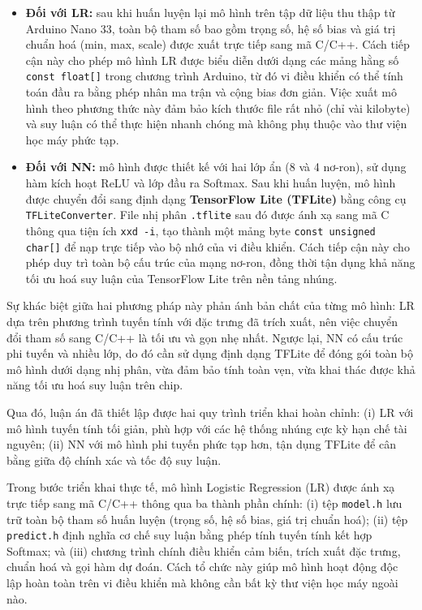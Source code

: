 \begin{itemize}
    \item \textbf{Đối với LR:} sau khi huấn luyện lại mô hình trên tập dữ liệu thu thập từ Arduino Nano 33, 
    toàn bộ tham số bao gồm trọng số, hệ số bias và giá trị chuẩn hoá (min, max, scale) 
    được xuất trực tiếp sang mã C/C++. Cách tiếp cận này cho phép mô hình LR 
    được biểu diễn dưới dạng các mảng hằng số \texttt{const float[]} trong chương trình Arduino, 
    từ đó vi điều khiển có thể tính toán đầu ra bằng phép nhân ma trận và cộng bias đơn giản. 
    Việc xuất mô hình theo phương thức này đảm bảo kích thước file rất nhỏ (chỉ vài kilobyte) 
    và suy luận có thể thực hiện nhanh chóng mà không phụ thuộc vào thư viện học máy phức tạp.  

    \item \textbf{Đối với NN:} mô hình được thiết kế với hai lớp ẩn (8 và 4 nơ-ron), 
    sử dụng hàm kích hoạt ReLU và lớp đầu ra Softmax. Sau khi huấn luyện, 
    mô hình được chuyển đổi sang định dạng \textbf{TensorFlow Lite (TFLite)} bằng công cụ \texttt{TFLiteConverter}. 
    File nhị phân \texttt{.tflite} sau đó được ánh xạ sang mã C thông qua tiện ích \texttt{xxd -i}, 
    tạo thành một mảng byte \texttt{const unsigned char[]} để nạp trực tiếp vào bộ nhớ của vi điều khiển. 
    Cách tiếp cận này cho phép duy trì toàn bộ cấu trúc của mạng nơ-ron, 
    đồng thời tận dụng khả năng tối ưu hoá suy luận của TensorFlow Lite trên nền tảng nhúng.  
\end{itemize}

Sự khác biệt giữa hai phương pháp này phản ánh bản chất của từng mô hình: 
LR dựa trên phương trình tuyến tính với đặc trưng đã trích xuất, 
nên việc chuyển đổi tham số sang C/C++ là tối ưu và gọn nhẹ nhất. 
Ngược lại, NN có cấu trúc phi tuyến và nhiều lớp, do đó cần sử dụng định dạng TFLite 
để đóng gói toàn bộ mô hình dưới dạng nhị phân, vừa đảm bảo tính toàn vẹn, 
vừa khai thác được khả năng tối ưu hoá suy luận trên chip.  

Qua đó, luận án đã thiết lập được hai quy trình triển khai hoàn chỉnh:  
(i) LR với mô hình tuyến tính tối giản, phù hợp với các hệ thống nhúng cực kỳ hạn chế tài nguyên;  
(ii) NN với mô hình phi tuyến phức tạp hơn, tận dụng TFLite để cân bằng giữa độ chính xác và tốc độ suy luận.  

Trong bước triển khai thực tế, mô hình Logistic Regression (LR) được ánh xạ trực tiếp sang mã C/C++ 
thông qua ba thành phần chính: (i) tệp \texttt{model.h} lưu trữ toàn bộ tham số huấn luyện (trọng số, hệ số bias, 
giá trị chuẩn hoá); (ii) tệp \texttt{predict.h} định nghĩa cơ chế suy luận bằng phép tính tuyến tính kết hợp Softmax; 
và (iii) chương trình chính điều khiển cảm biến, trích xuất đặc trưng, chuẩn hoá và gọi hàm dự đoán. 
Cách tổ chức này giúp mô hình hoạt động độc lập hoàn toàn trên vi điều khiển mà không cần bất kỳ thư viện học máy ngoài nào.  

